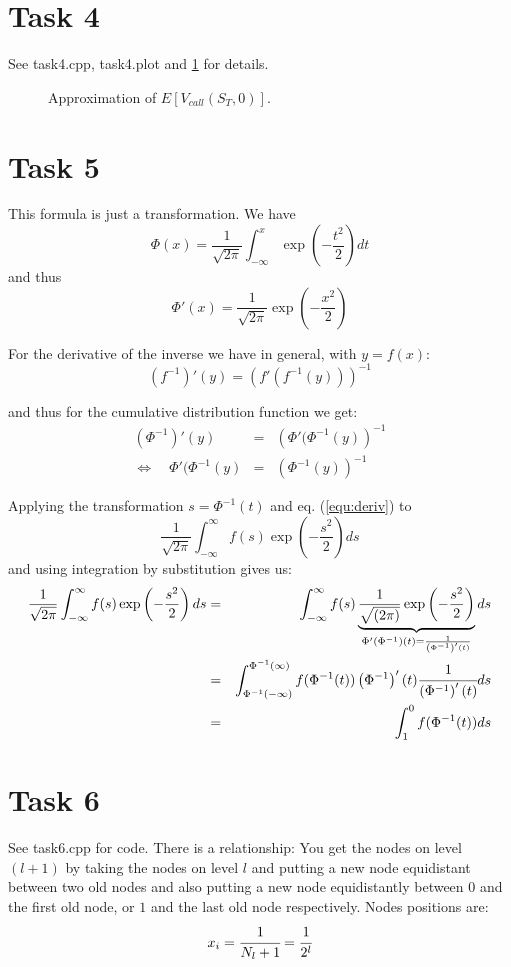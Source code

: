 \documentclass[]{article}
\begin{document}
\section*{Task 4}
See task4.cpp, task4.plot and \cref{fig:Task4} for details. 

\begin{figure}[!ht]

\caption{Approximation of $E\left[V_{call}(S_T,0)\right]$.}
\label{fig:Task4}
\end{figure}

\section*{Task 5} This formula is just a transformation. We have
\[\Phi(x)=\dfrac{1}{\sqrt{2\pi}}\int_{-\infty}^x
\exp\left({-\dfrac{t^2}{2}}\right)dt\] 
and thus
\[\Phi'(x)=\dfrac{1}{\sqrt{2\pi}}\exp\left({-\dfrac{x^2}{2}}\right)\]

For the derivative of the inverse we have in general, with $y = f(x)$:
\[\left(f^{-1}\right)'(y) = \left(f'\left(f^{-1}(y)\right)\right)^{-1}\]

and thus for the cumulative distribution function we get:
\begin{eqnarray}
\left(\Phi^{-1}\right)'(y) & = &
\left(\Phi'(\Phi^{-1}(y)\right)^{-1} \nonumber\\
\Leftrightarrow \quad \Phi'(\Phi^{-1}(y) & = & \left(\Phi^{-1}(y)\right)^{-1}
\label{equ:deriv}
\end{eqnarray}

Applying the transformation $s = \Phi^{-1}(t)$ and eq. (\ref{equ:deriv}) to 
\[\dfrac{1}{\sqrt{2\pi}}\int_{-\infty}^{\infty}f(s)\exp\left({-\dfrac{s^2}{2}}\right)ds\]
and using integration by substitution gives us:
\begin{eqnarray*}
\dfrac{1}{\sqrt{2\pi}}\int_{-\infty}^{\infty}f(s)\exp\left({-\dfrac{s^2}{2}}\right)ds
& = &
\int_{-\infty}^{\infty}f(s)\underbrace{\dfrac{1}{\sqrt{(2\pi)}}\exp\left({-\dfrac{s^2}{2}}\right)}_{\Phi'(\Phi^{-1})(t)
= \frac{1}{\left(\Phi^{-1}\right)'(t)}}ds \\
& =
&\int_{\Phi^{-1}(-\infty)}^{\Phi^{-1}(\infty)}f(\Phi^{-1}(t))\left(\Phi^{-1}\right)'(t)\cfrac{1}{\left(\Phi^{-1}\right)'(t)}ds
\\
& = &
\int_{1}^{0}f(\Phi^{-1}(t))ds
\end{eqnarray*}

\section*{Task 6} See task6.cpp for code. There is a relationship: You get the
nodes on level $(l+1)$ by taking the nodes on level $l$ and putting a new node
equidistant between two old nodes and also putting a new node equidistantly
between $0$ and the first old node, or $1$ and the last old node respectively.
Nodes positions are:
\begin{eqnarray*}
x_i = \cfrac{1}{N_l+1} = \cfrac{1}{2^l}
\end{eqnarray*}
\end{document}
